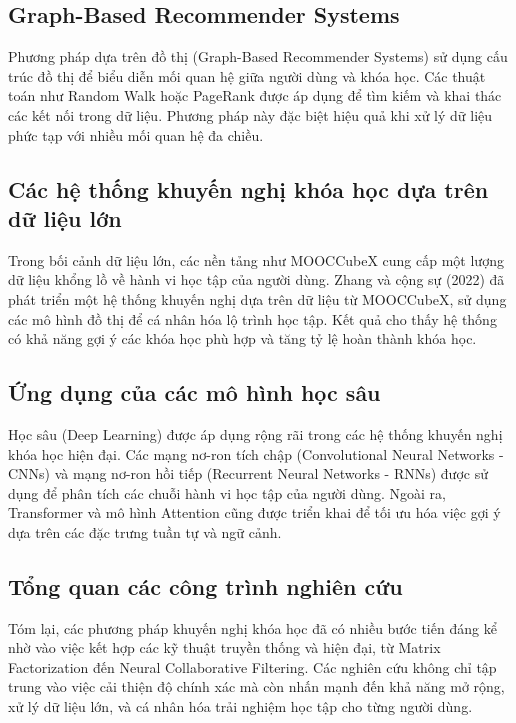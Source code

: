 \subsection{Graph-Based Recommender Systems}

Phương pháp dựa trên đồ thị (Graph-Based Recommender Systems) sử dụng cấu trúc đồ thị để biểu diễn mối quan hệ giữa người dùng và khóa học. Các thuật toán như Random Walk hoặc PageRank được áp dụng để tìm kiếm và khai thác các kết nối trong dữ liệu. Phương pháp này đặc biệt hiệu quả khi xử lý dữ liệu phức tạp với nhiều mối quan hệ đa chiều.

\subsection{Các hệ thống khuyến nghị khóa học dựa trên dữ liệu lớn}

Trong bối cảnh dữ liệu lớn, các nền tảng như MOOCCubeX cung cấp một lượng dữ liệu khổng lồ về hành vi học tập của người dùng. Zhang và cộng sự (2022) đã phát triển một hệ thống khuyến nghị dựa trên dữ liệu từ MOOCCubeX, sử dụng các mô hình đồ thị để cá nhân hóa lộ trình học tập. Kết quả cho thấy hệ thống có khả năng gợi ý các khóa học phù hợp và tăng tỷ lệ hoàn thành khóa học.

\subsection{Ứng dụng của các mô hình học sâu}

Học sâu (Deep Learning) được áp dụng rộng rãi trong các hệ thống khuyến nghị khóa học hiện đại. Các mạng nơ-ron tích chập (Convolutional Neural Networks - CNNs) và mạng nơ-ron hồi tiếp (Recurrent Neural Networks - RNNs) được sử dụng để phân tích các chuỗi hành vi học tập của người dùng. Ngoài ra, Transformer và mô hình Attention cũng được triển khai để tối ưu hóa việc gợi ý dựa trên các đặc trưng tuần tự và ngữ cảnh.

\subsection{Tổng quan các công trình nghiên cứu}

Tóm lại, các phương pháp khuyến nghị khóa học đã có nhiều bước tiến đáng kể nhờ vào việc kết hợp các kỹ thuật truyền thống và hiện đại, từ Matrix Factorization đến Neural Collaborative Filtering. Các nghiên cứu không chỉ tập trung vào việc cải thiện độ chính xác mà còn nhấn mạnh đến khả năng mở rộng, xử lý dữ liệu lớn, và cá nhân hóa trải nghiệm học tập cho từng người dùng.
